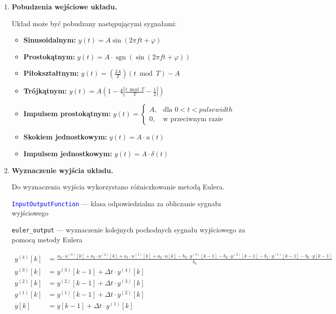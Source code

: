 \documentclass[10pt, a4paper]{article}
\begin{document}
\begin{enumerate}[label=\alph*.]
  \item \textbf{Pobudzenia wejściowe układu.} \par\vspace{0.1cm}
  Układ może być pobudzany następującymi sygnałami: 
  \begin{itemize}
  \item \textbf{Sinusoidalnym:} \( y(t) = A \sin(2\pi f t + \varphi) \)
  \item \textbf{Prostokątnym:} \( y(t) = A \cdot \operatorname{sgn}\left( \sin(2\pi f t + \varphi) \right) \)
  \item \textbf{Piłokształtnym:} \( y(t) = \left( \frac{2A}{T} \right) (t \bmod T) - A \)
  \item \textbf{Trójkątnym:} \(y(t) = A \left(1 - 4 \left| \frac{t \bmod T}{T} - \frac{1}{2} \right| \right)\)
  \item \textbf{Impulsem prostokątnym:} \( y(t) = 
  \begin{cases}
  A, & \text{dla } 0 < t < pulse width \\
  0, & \text{w przeciwnym razie}
  \end{cases}
  \)
  \item \textbf{Skokiem jednostkowym:} \( y(t) = A \cdot u(t) \)
  \item \textbf{Impulsem jednostkowym:} \(y(t) = A \cdot \delta(t)\)
\end{itemize}

\vspace{0.2cm}
  
  \item \textbf{Wyznaczenie wyjścia układu.} \par\vspace{0.1cm}
  Do wyznaczenia wyjścia wykorzystano różniczkowanie metodą Eulera. 

  \vspace{0.1cm}

  \textcolor{blue}{\texttt{InputOutputFunction}} --- klasa odpowiedzialna za obliczanie sygnału wyjściowego
  

\vspace{0.1cm}

{\texttt{euler\_output}} --- wyznaczenie kolejnych pochodnych sygnału wyjściowego za pomocą metody Eulera

{\footnotesize
\begin{align*}
y^{(4)}[k] &= \frac{a_3 \cdot u^{(3)}[k] + a_2 \cdot u^{(2)}[k] + a_1 \cdot u^{(1)}[k] + a_0 \cdot u[k] - b_3 \cdot y^{(3)}[k-1] - b_2 \cdot y^{(2)}[k-1] - b_1 \cdot y^{(1)}[k-1] - b_0 \cdot y[k-1]}{b_4} \\
y^{(3)}[k] &= y^{(3)}[k-1] + \Delta t \cdot y^{(4)}[k] \\
y^{(2)}[k] &= y^{(2)}[k-1] + \Delta t \cdot y^{(3)}[k] \\
y^{(1)}[k] &= y^{(1)}[k-1] + \Delta t \cdot y^{(2)}[k] \\
y[k] &= y[k-1] + \Delta t \cdot y^{(1)}[k]
\end{align*}
}




\end{enumerate}
\end{document}
